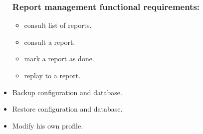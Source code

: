 \documentclass[a4paper,12p]{article}
\begin{document}
\begin{itemize}
     \subsubsection{Report management functional requirements:}
     \begin{itemize}
         \item consult list of reports.
         \item consult a report.
         \item mark a report as done.
         \item replay to a report.
     \end{itemize}

     \item Backup configuration and database.
     \item Restore configuration and database.
     \item Modify his own profile.
    \end{itemize}
\end{document}
